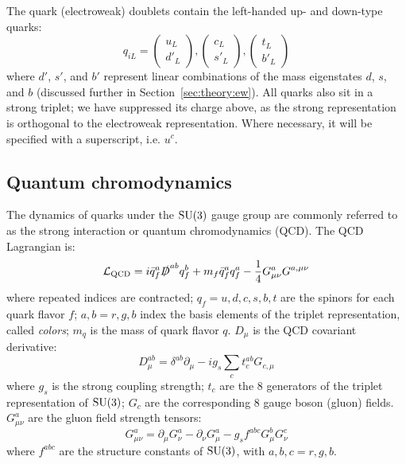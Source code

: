 The quark (electroweak) doublets contain the left-handed up- and down-type quarks:
\begin{equation}
    q_{iL} = 
    \left(\begin{matrix} u_L \\ d'_L \end{matrix}\right),
    \left(\begin{matrix} c_L \\ s'_L \end{matrix}\right),
    \left(\begin{matrix} t_L \\ b'_L \end{matrix}\right)
\end{equation}
where ${d'}$, ${s'}$, and ${b'}$ represent linear combinations of the mass eigenstates ${d}$, ${s}$, and ${b}$ (discussed further in Section~\ref{sec:theory:ew}).
All quarks also sit in a strong triplet; we have suppressed its charge above, as the strong representation is orthogonal to the electroweak representation.
Where necessary, it will be specified with a superscript, i.e. ${u^{c}}$.

\subsection{Quantum chromodynamics}
The dynamics of quarks under the ${\operatorname{\mathrm{SU}}(3)}$ gauge group are commonly referred to as the strong interaction or quantum chromodynamics (QCD).
The QCD Lagrangian is:
\begin{equation}
    \mathcal{L}_\mathrm{QCD} = 
        i \bar q^{a}_f \slashed D^{ab} q^{b}_f  
        + m_f \bar{q}^{a}_f q^{a}_f
        - \frac{1}{4} G^{a}_{\mu\nu} G^{a,\mu\nu}
    \label{eq:theory:lqcd}
\end{equation}
where repeated indices are contracted; ${q_f=u,d,c,s,b,t}$ are the spinors for each quark flavor ${f}$; ${a,b=r,g,b}$ index the basis elements of the triplet representation, called \emph{colors}; ${m_q}$ is the mass of quark flavor ${q}$.
${D_\mu}$ is the QCD covariant derivative:
\begin{equation}
    D_\mu^{ab} = \delta^{ab} \partial_\mu - i g_s \sum_c t^{ab}_c G_{c,\mu}
\end{equation}
where ${g_s}$ is the strong coupling strength; ${t_c}$ are the 8 generators of the triplet representation of ${\operatorname{\mathrm{SU}}(3)}$; ${G_c}$ are the corresponding 8 gauge boson (gluon) fields. 
${G^a_{\mu\nu}}$ are the gluon field strength tensors:
\begin{equation}
    G^a_{\mu\nu} = \partial_\mu G_\nu^a - \partial_\nu G_\mu^a - g_s f^{abc} G_\mu^b G_\nu^c
\end{equation}
where ${f^{abc}}$ are the structure constants of ${\operatorname{\mathrm{SU}}(3)}$, with ${a,b,c=r,g,b}$.

